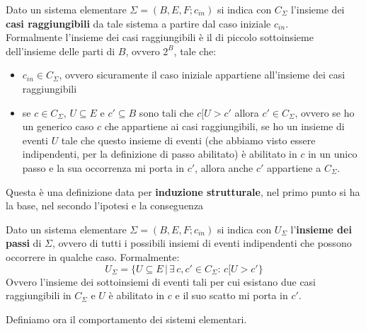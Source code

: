 \documentclass[a4paper,12pt, oneside]{book}
\begin{document}
\begin{definizione}
  Dato un sistema elementare $\Sigma=(B,E,F;c_{in})$ si indica con $C_\Sigma$
  l'insieme dei \textbf{casi raggiungibili} da tale sistema a partire dal caso
  iniziale $c_{in}$.\\
  Formalmente l'insieme dei casi raggiungibili è il di piccolo sottoinsieme
  dell'insieme delle parti di $B$, ovvero $2^B$, tale che:
  \begin{itemize}
    \item $c_{in}\in C_\Sigma$, ovvero sicuramente il caso iniziale appartiene
    all'insieme dei casi raggiungibili
    \item se $c\in C_\Sigma,\,U\subseteq E$ e $c'\subseteq B$ sono tali che
    $c[U>c'$ allora $c'\in C_\Sigma$, ovvero se ho un generico caso $c$ che
    appartiene ai casi raggiungibili, se ho un insieme di eventi $U$ tale che
    questo insieme di eventi (che abbiamo visto essere indipendenti, per la
    definizione di passo abilitato) è abilitato
    in $c$ in un unico passo e la sua occorrenza mi porta in $c'$, allora anche
    $c'$ appartiene a $C_\Sigma$. 
  \end{itemize}
  Questa è una definizione data per \textbf{induzione strutturale}, nel primo
  punto si ha la base, nel secondo l'ipotesi e la conseguenza
\end{definizione}
\begin{definizione}
  Dato un sistema elementare $\Sigma=(B,E,F;c_{in})$ si indica con $U_\Sigma$
  l'\textbf{insieme dei passi} di $\Sigma$, ovvero di tutti i possibili insiemi
  di eventi indipendenti che possono occorrere in qualche caso. Formalmente:
  \[U_\Sigma =\{U\subseteq E\,|\,\exists\, c,c'\in C_\Sigma :\, c[U>c'\}\]
  Ovvero l'insieme dei sottoinsiemi di eventi tali per cui esistano due casi
  raggiungibili in $C_\Sigma$ e $U$ è abilitato in $c$ e il suo scatto mi porta
  in $c'$.
\end{definizione}
Definiamo ora il comportamento dei sistemi elementari.
\end{document}
